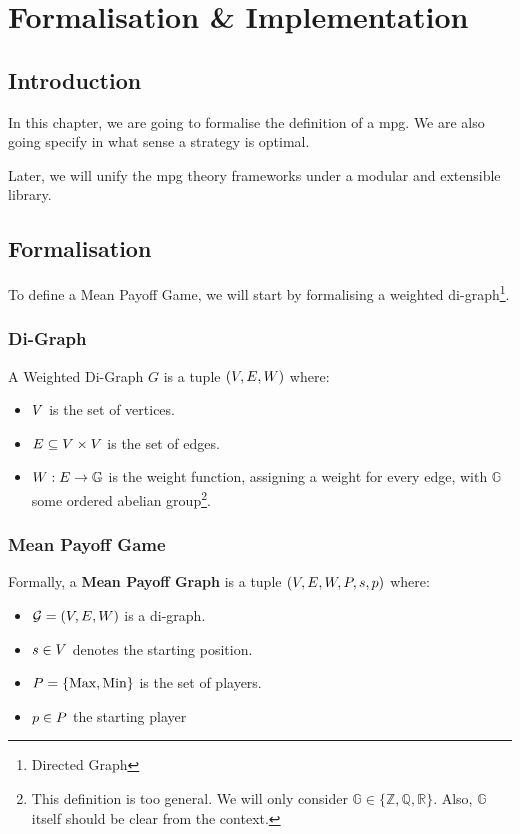 \chapter{Formalisation \& Implementation}
\section*{Introduction}
In this chapter, we are going to formalise the definition of a \acrshort{mpg}. We are also going specify in what sense a strategy is optimal.

Later, we will unify the \acrshort{mpg} theory frameworks under a modular and extensible library.

\section{Formalisation}
To define a Mean Payoff Game, we will start by formalising a weighted di-graph\footnote{Directed Graph}.

\subsection{Di-Graph}
A Weighted Di-Graph $G$ is a tuple $(V,E,W)$ where:

\begin{itemize}
		\item $V$ is the set of vertices.
		\item $E \subseteq V\times V$ is the set of edges.
		\item $W:E\rightarrow \mathbb{G}$ is the weight function, assigning a weight for every edge, with $\mathbb{G}$ some ordered abelian group\footnote{This definition is too general. We will only consider $\mathbb{G}\in \{\mathbb{Z},\mathbb{Q},\mathbb{R}\}.$ Also, $\mathbb{G}$ itself should be clear from the context.}. 
\end{itemize}
\newpage
\subsection{Mean Payoff Game}
\label{section:Formalisation:MPG}
\label{section:Formalisation:MeanPayoffGame}
\label{section:Formalisation:MeanPayoffGraph}
Formally, a \textbf{Mean Payoff Graph} is a tuple $(V,E,W,P,s,p)$ where:
\begin{itemize}
	\item $\mathcal{G}=(V,E,W)$ is a di-graph.
		\item $s\in V$ denotes the starting position.
	\item $P=\{\text{Max},\text{Min}\}$ is the set of players.
	\item $p\in P$ the starting player
\end{itemize}



